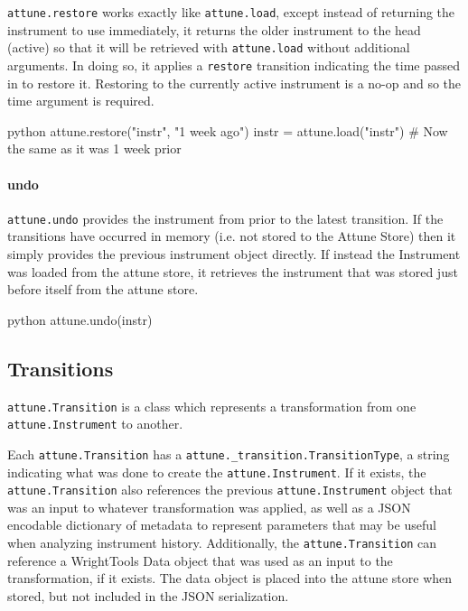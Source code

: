 \texttt{attune.restore} works exactly like \texttt{attune.load}, except
instead of returning the instrument to use immediately, it returns the
older instrument to the head (active) so that it will be retrieved with
\texttt{attune.load} without additional arguments. In doing so, it
applies a \texttt{restore} transition indicating the time passed in to
restore it. Restoring to the currently active instrument is a no-op and
so the time argument is required.

\begin{codefragment}{python}
attune.restore("instr", "1 week ago")
instr = attune.load("instr")  # Now the same as it was 1 week prior
\end{codefragment}

\hypertarget{undo}{%
\paragraph{undo}\label{undo}}

\texttt{attune.undo} provides the instrument from prior to the latest
transition. If the transitions have occurred in memory (i.e. not stored
to the Attune Store) then it simply provides the previous instrument
object directly. If instead the Instrument was loaded from the attune
store, it retrieves the instrument that was stored just before itself
from the attune store.

\begin{codefragment}{python}
attune.undo(instr)
\end{codefragment}


\hypertarget{transitions}{%
\subsection{Transitions}\label{transitions}}

\texttt{attune.Transition} is a class which represents
a transformation from one \texttt{attune.Instrument} to
another.

Each \texttt{attune.Transition} has a
\texttt{attune.\_transition.TransitionType}, a string
indicating what was done to create the
\texttt{attune.Instrument}. If it exists, the
\texttt{attune.Transition} also references the previous
\texttt{attune.Instrument} object that was an input to
whatever transformation was applied, as well as a JSON encodable
dictionary of metadata to represent parameters that may be useful when
analyzing instrument history. Additionally, the
\texttt{attune.Transition} can reference a WrightTools
Data object that was used as an input to the transformation, if it
exists. The data object is placed into the attune store when stored, but
not included in the JSON serialization.

